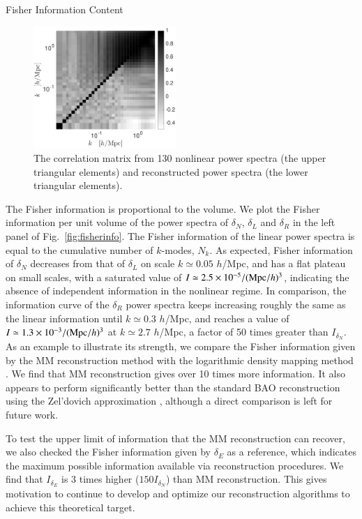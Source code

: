 \begin{section}{Fisher Information Content}
  \begin{figure}
    \centering
    \includegraphics[width=0.48\textwidth]{fig3.pdf}
    \caption{The correlation matrix from 130 nonlinear power
      spectra (the upper triangular elements) and reconstructed power
      spectra (the lower triangular elements).}
    \label{fig:corrall}
  \end{figure}

  The Fisher information is proportional to the volume. 
  We plot the Fisher information per unit volume of the power spectra of
  $\delta_N$, $\delta_L$ and $\delta_R$ in the left panel of 
  Fig.~\ref{fig:fisherinfo}. The Fisher information of the linear 
  power spectra is equal to the cumulative number of $k$-modes, $N_k$. As expected, Fisher information of
  $\delta_N$ decreases from that of $\delta_L$ on scale
  $k \simeq 0.05$ $h$/Mpc, and has a flat plateau on small scales, 
  with a saturated value of
  $I \simeq 2.5 \times 10^{-5}/({\rm Mpc}/h)^3$, indicating
  the absence of independent information in the nonlinear
  regime.  In comparison, the information curve of the $\delta_R$ power
  spectra keeps increasing roughly the same as the linear information
  until $k\simeq 0.3$ $h$/Mpc, and reaches a value of 
  $I \simeq 1.3 \times 10^{-3}/({\rm Mpc}/h)^3$ at $k \simeq 2.7$ $h$/Mpc,
  a factor of 50 times greater than $I_{\delta_N}$.
  As an example to illustrate its strength, we compare the Fisher information given by the MM reconstruction method
  with the logarithmic density mapping method \citep{bib:Mark2009}. We find that MM
  reconstruction gives over 10 times more information.  It also appears to perform 
  significantly better than the standard BAO reconstruction using the Zel'dovich 
  approximation \citep{bib:Ngan2012}, although a direct comparison is left for future work.
  
  To test the upper limit of information that the MM reconstruction can recover, 
  we also checked the Fisher information given by $\delta_E$ \citep{bib:Yu2016} as a reference, 
  which indicates the maximum possible information available via reconstruction procedures.
  We find that $I_{\delta_E}$ is 3 times higher ($150 I_{\delta_N}$) than MM reconstruction.
  This gives motivation to continue to develop and optimize our 
  reconstruction algorithms to achieve this theoretical target.
  

\end{section}
